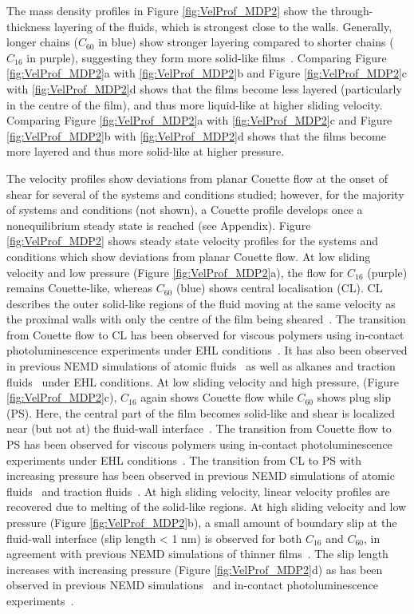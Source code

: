 \documentclass[5p]{elsarticle}
\begin{document}
The mass density profiles in Figure \ref{fig:VelProf_MDP2} show the through-thickness layering of the fluids, which is strongest close to the walls. Generally, longer chains ($C_{60}$ in blue) show stronger layering compared to shorter chains ($C_{16}$ in purple), suggesting they form more solid-like films~\cite{Ewen2017a}. Comparing Figure \ref{fig:VelProf_MDP2}a with \ref{fig:VelProf_MDP2}b and Figure \ref{fig:VelProf_MDP2}c with \ref{fig:VelProf_MDP2}d shows that the films become less layered (particularly in the centre of the film), and thus more liquid-like at higher sliding velocity. Comparing Figure \ref{fig:VelProf_MDP2}a with \ref{fig:VelProf_MDP2}c and Figure \ref{fig:VelProf_MDP2}b with \ref{fig:VelProf_MDP2}d shows that the films become more layered and thus more solid-like at higher pressure.

The velocity profiles show deviations from planar Couette flow at the onset of shear for several of the systems and conditions studied; however, for the majority of systems and conditions (not shown), a Couette profile develops once a nonequilibrium steady state is reached (see Appendix). Figure \ref{fig:VelProf_MDP2} shows steady state velocity profiles for the systems and conditions which show deviations from planar Couette flow. At low sliding velocity and low pressure (Figure \ref{fig:VelProf_MDP2}a), the flow for $C_{16}$ (purple) remains Couette-like, whereas $C_{60}$ (blue) shows central localisation (CL). CL describes the outer solid-like regions of the fluid moving at the same velocity as the proximal walls with only the centre of the film being sheared~\cite{Heyes2012}. The transition from Couette flow to CL has been observed for viscous polymers using in-contact photoluminescence experiments under EHL conditions~\cite{Galmiche2016}. It has also been observed in previous NEMD simulations of atomic fluids~\cite{Heyes2012,Gattinoni2013,Mackowiak2016} as well as alkanes and traction fluids~\cite{Ewen2017a} under EHL conditions. At low sliding velocity and high pressure, (Figure \ref{fig:VelProf_MDP2}c), $C_{16}$ again shows Couette flow while $C_{60}$ shows plug slip (PS). Here, the central part of the film becomes solid-like and shear is localized near (but not at) the fluid-wall interface~\cite{Heyes2012}. The transition from Couette flow to PS has been observed for viscous polymers using in-contact photoluminescence experiments under EHL conditions~\cite{Ponjavic2014a}. The transition from CL to PS with increasing pressure has been observed in previous NEMD simulations of atomic fluids~\cite{Heyes2012,Gattinoni2013,Mackowiak2016} and traction fluids~\cite{Ewen2017a}. At high sliding velocity, linear velocity profiles are recovered due to melting of the solid-like regions. At high sliding velocity and low pressure (Figure \ref{fig:VelProf_MDP2}b), a small amount of boundary slip at the fluid-wall interface (slip length < 1 nm) is observed for both $C_{16}$ and $C_{60}$, in agreement with previous NEMD simulations of thinner films~\cite{Sivebaek2010,Ta2017}. The slip length increases with increasing pressure (Figure \ref{fig:VelProf_MDP2}d) as has been observed in previous NEMD simulations~\cite{Ta2017} and in-contact photoluminescence experiments~\cite{Ponjavic2014}.
\end{document}
